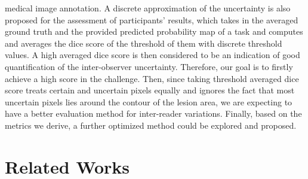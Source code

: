 \documentclass[12pt]{extarticle}
\begin{document}
medical image annotation. A discrete approximation of the uncertainty is also
proposed for the assessment of participants' results, which
takes in the averaged ground truth and the provided predicted probability map of a task
and computes and averages the dice score of the threshold of them with
discrete threshold values\cite{qubiq}. A high averaged dice score is then considered to 
be an indication of good quantification of the inter-observer uncertainty.
Therefore, our goal is to firstly achieve a high score in the challenge. 
Then, since taking threshold averaged dice score treats certain and uncertain pixels equally 
and ignores the fact that most uncertain pixels lies around 
the contour of the lesion area, we are expecting to have a
better evaluation method for inter-reader variations. 
Finally, based on the metrics we derive, a further
optimized method could be explored and proposed.
\section{Related Works}
\end{document}
